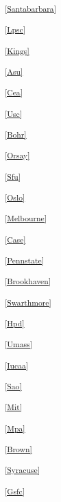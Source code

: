 \begin{multicols}{2}
\noindent
\textsuperscript{\ref{Santabarbara}}\Santabarbaratext

\noindent
\textsuperscript{\ref{Lpsc}}\Lpsctext

\noindent
\textsuperscript{\ref{Kings}}\Kingstext

\noindent
\textsuperscript{\ref{Asu}}\Asutext

\noindent
\textsuperscript{\ref{Cea}}\Ceatext

\noindent
\textsuperscript{\ref{Usc}}\Usctext

\noindent
\textsuperscript{\ref{Bohr}}\Bohrtext

\noindent
\textsuperscript{\ref{Orsay}}\Orsaytext

\noindent
\textsuperscript{\ref{Sfu}}\Sfutext

\noindent
\textsuperscript{\ref{Oslo}}\Oslotext

\noindent
\textsuperscript{\ref{Melbourne}}\Melbournetext

\noindent
\textsuperscript{\ref{Case}}\Casetext

\noindent
\textsuperscript{\ref{Pennstate}}\Pennstatetext

\noindent
\textsuperscript{\ref{Brookhaven}}\Brookhaventext

\noindent
\textsuperscript{\ref{Swarthmore}}\Swarthmoretext

\noindent
\textsuperscript{\ref{Hpd}}\Hpdtext

\noindent
\textsuperscript{\ref{Umass}}\Umasstext

\noindent
\textsuperscript{\ref{Iucaa}}\Iucaatext

\noindent
\textsuperscript{\ref{Sao}}\Saotext

\noindent
\textsuperscript{\ref{Mit}}\Mittext

\noindent
\textsuperscript{\ref{Mpa}}\Mpatext

\noindent
\textsuperscript{\ref{Brown}}\Browntext

\noindent
\textsuperscript{\ref{Syracuse}}\Syracusetext

\noindent
\textsuperscript{\ref{Gsfc}}\Gsfctext

\normalsize

\end{multicols}

\parskip=8pt
